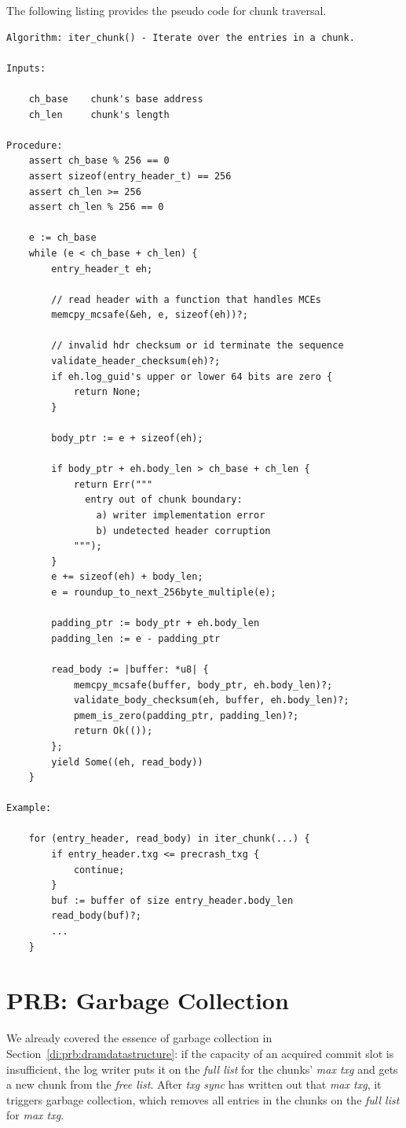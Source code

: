 \documentclass[12pt,a4paper,twoside]{book}
\begin{document}
The following listing provides the pseudo code for chunk traversal.
\begin{lstlisting}[style=figurepseudocode]
Algorithm: iter_chunk() - Iterate over the entries in a chunk.

Inputs:

    ch_base    chunk's base address
    ch_len     chunk's length

Procedure:
    assert ch_base % 256 == 0
    assert sizeof(entry_header_t) == 256
    assert ch_len >= 256
    assert ch_len % 256 == 0

    e := ch_base
    while (e < ch_base + ch_len) {
        entry_header_t eh;

        // read header with a function that handles MCEs
        memcpy_mcsafe(&eh, e, sizeof(eh))?;

        // invalid hdr checksum or id terminate the sequence
        validate_header_checksum(eh)?;
        if eh.log_guid's upper or lower 64 bits are zero {
            return None;
        }

        body_ptr := e + sizeof(eh);

        if body_ptr + eh.body_len > ch_base + ch_len {
            return Err("""
              entry out of chunk boundary:
                a) writer implementation error
                b) undetected header corruption
            """);
        }
        e += sizeof(eh) + body_len;
        e = roundup_to_next_256byte_multiple(e);

        padding_ptr := body_ptr + eh.body_len
        padding_len := e - padding_ptr

        read_body := |buffer: *u8| {
            memcpy_mcsafe(buffer, body_ptr, eh.body_len)?;
            validate_body_checksum(eh, buffer, eh.body_len)?;
            pmem_is_zero(padding_ptr, padding_len)?;
            return Ok(());
        };
        yield Some((eh, read_body))
    }

Example:

    for (entry_header, read_body) in iter_chunk(...) {
        if entry_header.txg <= precrash_txg {
            continue;
        }
        buf := buffer of size entry_header.body_len
        read_body(buf)?;
        ...
    }
\end{lstlisting}

\section{PRB: Garbage Collection}\label{di:prb:gc}
We already covered the essence of garbage collection in Section~\ref{di:prb:dramdatastructure}:
if the capacity of an acquired commit slot is insufficient, the log writer puts it on the \textit{full list} for the chunks' \textit{max txg} and gets a new chunk from the \textit{free list}.
After \textit{txg sync} has written out that \textit{max txg}, it triggers garbage collection, which removes all entries in the chunks on the \textit{full list} for \textit{max txg}.
\end{document}
